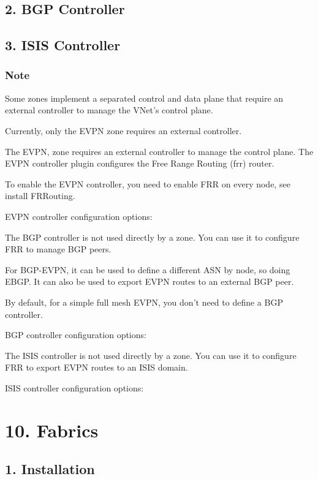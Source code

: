 \subsection{2. BGP Controller}

\subsection{3. ISIS Controller}

\subsubsection{Note}

Some zones implement a separated control and data plane that require an external controller to manage the VNet’s control plane.

Currently, only the EVPN zone requires an external controller.

The EVPN, zone requires an external controller to manage the control plane. The EVPN controller plugin configures the Free Range Routing (frr) router.

To enable the EVPN controller, you need to enable FRR on every node, see install FRRouting.

EVPN controller configuration options:

The BGP controller is not used directly by a zone. You can use it to configure FRR to manage BGP peers.

For BGP-EVPN, it can be used to define a different ASN by node, so doing EBGP. It can also be used to export EVPN routes to an external BGP peer.

By default, for a simple full mesh EVPN, you don’t need to define a BGP controller.

BGP controller configuration options:

The ISIS controller is not used directly by a zone. You can use it to configure FRR to export EVPN routes to an ISIS domain.

ISIS controller configuration options:


\section{10. Fabrics}

\subsection{1. Installation}

